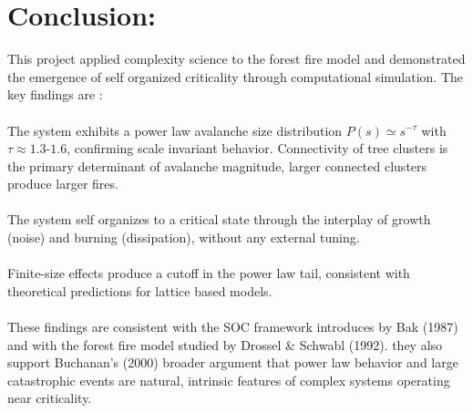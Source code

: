 \documentclass{article}
\begin{document}
\section{Conclusion: }
This project applied complexity science to the forest fire model and demonstrated the emergence of self organized criticality through computational simulation. The key findings are :\\
\\
The system exhibits a power law avalanche size distribution $ P(s) \simeq s^{-\tau} $ with $ \tau \approx 1.3\text{-}1.6 $, confirming scale invariant behavior. Connectivity of tree clusters is the primary determinant of avalanche magnitude, larger connected clusters produce larger fires.\\
\\ 
The system self organizes to a critical state through the interplay of growth (noise) and burning (dissipation), without any external tuning.\\
\\
Finite-size effects produce a cutoff in the power law tail, consistent with theoretical predictions for lattice based models.\\
\\
These findings are consistent with the SOC framework introduces by Bak (1987) and with the forest fire model studied by Drossel & Schwabl (1992). they also support Buchanan's (2000) broader argument that power law behavior and large catastrophic events are natural, intrinsic features of complex systems operating near criticality.\\ 
\\
\end{document}
